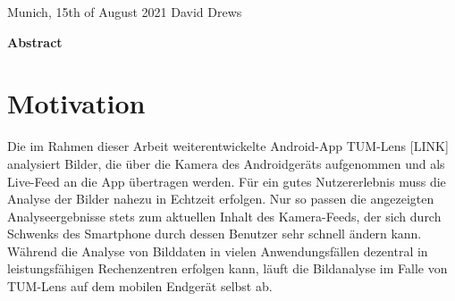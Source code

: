 \documentclass[
			   fontsize=11pt,
               paper=a4,
               bibliography=totoc,
               idxtotoc,
               headsepline,
               footsepline,
               footinclude=false,
               BCOR=12mm,
               DIV=13,
               openany,   %
               ]
               {scrbook}
\def\author{David Drews}
\def\date{15th of August 2021}
\begin{document}
\vspace{15mm}
\noindent
Munich, \date \hspace{5cm} \author
\cleardoubleemptypage


{}
\vspace*{2cm}
\begin{center}
    {\Large \textbf {Abstract}}
\end{center}
\vspace{1cm}

\lipsum[2]

\cleardoublepage


\tableofcontents
\thispagestyle{empty}
\cleardoubleemptypage


\mainmatter
\chapter{Motivation}

Die im Rahmen dieser Arbeit weiterentwickelte Android-App TUM-Lens [LINK] analysiert Bilder, die über die Kamera des Androidgeräts aufgenommen und als Live-Feed an die App übertragen werden. Für ein gutes Nutzererlebnis muss die Analyse der Bilder nahezu in Echtzeit erfolgen. Nur so passen die angezeigten Analyseergebnisse stets zum aktuellen Inhalt des Kamera-Feeds, der sich durch Schwenks des Smartphone durch dessen Benutzer sehr schnell ändern kann. Während die Analyse von Bilddaten in vielen Anwendungsfällen dezentral in leistungsfähigen Rechenzentren erfolgen kann, läuft die Bildanalyse im Falle von TUM-Lens auf dem mobilen Endgerät selbst ab.

\end{document}
